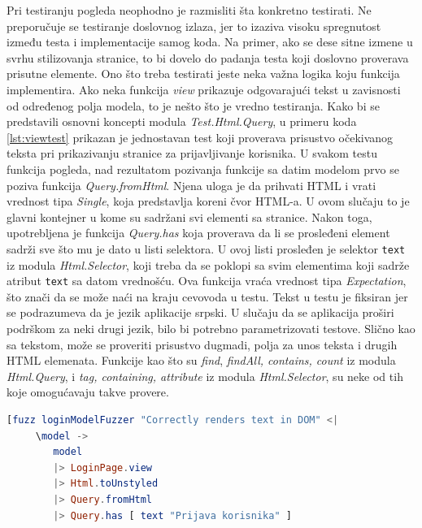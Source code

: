 \documentclass[12pt,oneside]{memoir}
\begin{document}
\par Pri testiranju pogleda neophodno je razmisliti šta konkretno testirati. Ne preporučuje se testiranje doslovnog izlaza, jer to izaziva visoku spregnutost između testa i implementacije samog koda. Na primer, ako se dese sitne izmene u svrhu stilizovanja stranice, to bi dovelo do padanja testa koji doslovno proverava prisutne elemente. Ono što treba testirati jeste neka važna logika koju funkcija implementira. Ako neka funkcija \emph{view} prikazuje odgovarajući tekst u zavisnosti od određenog polja modela, to je nešto što je vredno testiranja. Kako bi se predstavili osnovni koncepti modula \emph{Test.Html.Query}, u primeru koda \ref{lst:viewtest} prikazan je jednostavan test koji proverava prisustvo očekivanog teksta pri prikazivanju stranice za prijavljivanje korisnika. U svakom testu funkcija pogleda, nad rezultatom pozivanja funkcije sa datim modelom prvo se poziva funkcija \emph{Query.fromHtml}. Njena uloga je da prihvati HTML i vrati vrednost tipa \emph{Single}, koja predstavlja koreni čvor HTML-a. U ovom slučaju to je glavni kontejner u kome su sadržani svi elementi sa stranice. Nakon toga, upotrebljena je funkcija \emph{Query.has} koja proverava da li se prosleđeni element sadrži sve što mu je dato u listi selektora. U ovoj listi prosleđen je selektor \texttt{text} iz modula \emph{Html.Selector}, koji treba da se poklopi sa svim elementima koji sadrže atribut \texttt{text} sa datom vrednošću. Ova funkcija vraća vrednost tipa \emph{Expectation}, što znači da se može naći na kraju cevovoda u testu. Tekst u testu je fiksiran jer se podrazumeva da je jezik aplikacije srpski. U slučaju da se aplikacija proširi podrškom za neki drugi jezik, bilo bi potrebno parametrizovati testove. Slično kao sa tekstom, može se proveriti prisustvo dugmadi, polja za unos teksta i drugih HTML elemenata. Funkcije kao što su \emph{find}, \emph{findAll, contains, count} iz modula \emph{Html.Query}, i \emph{tag, containing, attribute} iz modula \emph{Html.Selector}, su neke od tih koje omogućavaju takve provere.

\begin{minipage}{\linewidth}
\begin{lstlisting}[language=elm, basicstyle=\small, caption={Test za funkciju \emph{view} modula \emph{LoginPage}},captionpos=b, label={lst:viewtest}]
    [fuzz loginModelFuzzer "Correctly renders text in DOM" <|
     \model ->
        model
        |> LoginPage.view 
        |> Html.toUnstyled
        |> Query.fromHtml
        |> Query.has [ text "Prijava korisnika" ]
\end{lstlisting}
\end{minipage}
\end{document}
